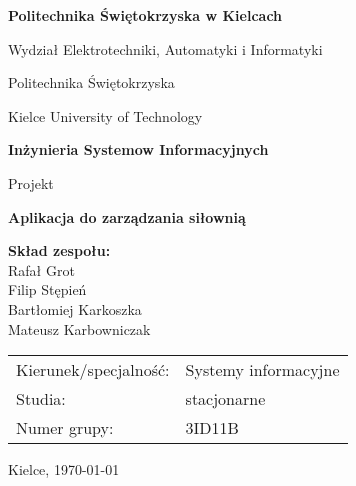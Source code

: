 \documentclass[../../spr.tex]{subfiles}
\begin{document}
\begin{titlepage}
  \centering

  {\fontsize{16}{18}\selectfont \bfseries Politechnika Świętokrzyska w Kielcach}

  \vspace{0.5cm}
  Wydział Elektrotechniki, Automatyki i Informatyki

  \vspace{1.5cm}
  {\large Politechnika Świętokrzyska}

  \vspace{0.2cm}
  {\large Kielce University of Technology}

  \vfill

  {\LARGE \bfseries Inżynieria Systemow Informacyjnych}

  \vspace{1.5cm}
  {\Huge Projekt}

  \vfill

  {\Huge \bfseries Aplikacja do zarządzania siłownią}

  \vfill

  \begin{flushleft}
    \begin{minipage}{0.5\textwidth}
      \large
      \textbf{Skład zespołu:} \\
      Rafał Grot \\
      Filip Stępień \\
      Bartłomiej Karkoszka \\
      Mateusz Karbowniczak
    \end{minipage}

    \vspace{2cm}

    \begin{minipage}{0.8\textwidth}
      \large
      \begin{tabular}{p{5cm}p{5cm}}
        Kierunek/specjalność: & Systemy informacyjne \\
        Studia:               & stacjonarne          \\
        Numer grupy:          & 3ID11B
      \end{tabular}
    \end{minipage}
  \end{flushleft}

  \vspace{1cm}

  \large Kielce, \today
\end{titlepage}
\end{document}
